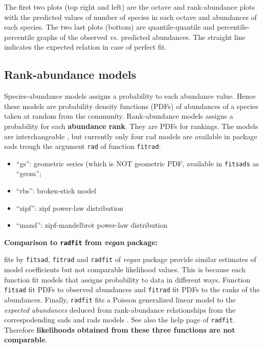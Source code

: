 \documentclass[11pt, A4]{article}
\newcommand{\code}[1]{\texttt{#1}}
\begin{document}
The first two plots (top right and left) are the octave and rank-abundance plots with the predicted values 
of number of species in each octave 
and abundances of each species. The two last plots (bottom) are quantile-quantile and percentile-percentile graphs of 
the observed vs. predicted abundances. The straight line indicates the expected relation in case of perfect fit.

\subsection{Rank-abundance models}

Species-abundance models assigns a probability to each abundance
value. Hence these models are probability density functions (PDFs) of
abundances of a species taken at random from the
community. Rank-abundance models assigns a probability for each
\textbf{abundance rank}. They are PDFs for rankings. The models are
interchangeable \citep{May1975}, but currently only four rad models
are available in package sads trough the argument \code{rad} of
function \code{fitrad}:

\begin{itemize}
\item ``gs'': geometric series (which is NOT geometric PDF, available
  in \code{fitsads} as ``geom'';
\item ``rbs'': broken-stick model \citep{macarthur1957, May1975}
\item ``zipf'': zipf power-law distribution
\item ``mand'': zipf-mandelbrot power-law distribution
\end{itemize}

\begin{shaded}
  \textbf{Comparison to \code{radfit} from \emph{vegan} package:} \hfill
  
  fits by \code{fitsad}, \code{fitrad} and \code{radfit} of \emph{vegan} 
  package provide similar estimates of model coefficients 
  but not comparable likelihood values. This is because each function fit models that assigns 
  probability to data in different ways. Function \code{fitsad} fit PDFs to observed abundances and \code{fitrad} fit PDFs 
  to the ranks of the abundances. Finally, \code{radfit} fits a Poisson generalized linear model 
  to the \emph{expected abundances} deduced 
  from rank-abundance relationships from the correspodending sads and rads models \citep{wilson1991}. 
  See also the help page of \code{radfit}. 
  Therefore \textbf{likelihoods obtained from these three functions are not comparable}.
\end{shaded}
\end{document}
